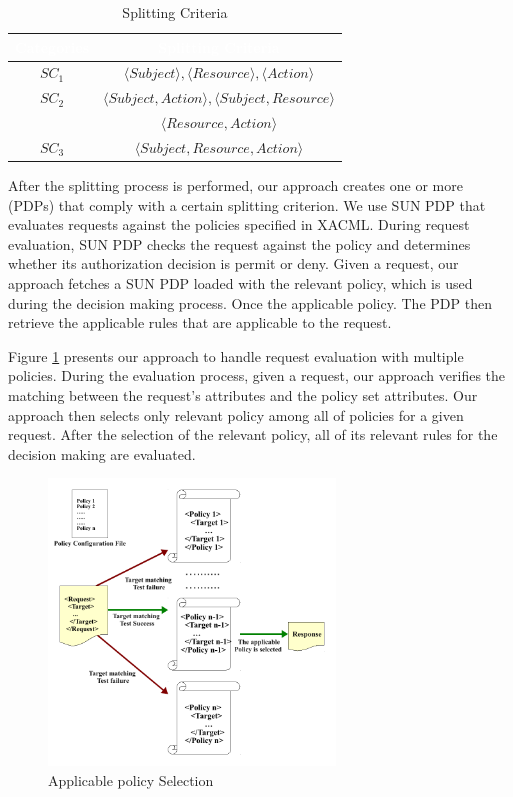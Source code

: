 \begin{table}[h!]
\centering
\setlength{\extrarowheight}{6 pt}
\begin{tabular}{|>{\small}c|>{\small}c|}
\hline \rowcolor{black}
\bf
\textcolor{white}{Categories}& \bf \textcolor{white}{Splitting Criteria}\\ \hline
$SC_{1}$& {$\langle Subject \rangle, \langle Resource\rangle, \langle Action\rangle$}\\ \hline
$SC_{2}$& {$\langle Subject,Action \rangle, \langle Subject,Resource\rangle$}\\&{$\langle Resource,Action\rangle$}\\ \hline
$SC_{3}$& {$\langle Subject,Resource,Action\rangle$}\\ \hline
\end{tabular}
\caption{Splitting Criteria}
\label{table1}\end{table}



After the splitting process is performed, our approach creates one or more (PDPs) that comply with a certain splitting criterion.
We use SUN PDP \cite{sunxacml} that evaluates requests against the policies specified in XACML.
During request evaluation, SUN PDP checks the request against the policy and determines whether its authorization
decision is permit or deny. Given a request, our approach fetches a SUN PDP loaded with the relevant policy, which is used during the decision making process. Once the applicable policy. The PDP then retrieve the applicable rules that are applicable to the request.


Figure \ref{requestevaluation} presents our approach to handle request evaluation with multiple policies.
During the evaluation process, given a request, our approach verifies the matching between the request's attributes
and the policy set attributes. Our approach then selects only relevant policy among all of policies for a given request.
After the selection of the relevant policy, all of its relevant rules for the decision making are evaluated.

\begin{figure}[!h]
\begin{center}
\includegraphics[width=3in, height=3in]{requestevaluation}
\caption{Applicable policy Selection}
\label{requestevaluation}
\end{center}
\end{figure}


